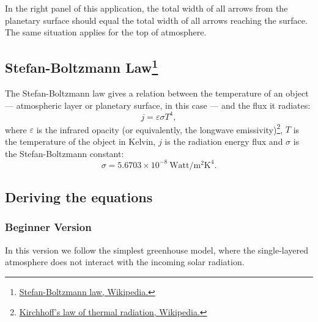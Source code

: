 \documentclass[a4paper,12pt]{article}
\begin{document}
In the right panel of this application, the total width of all arrows from the planetary surface should equal the total width of all arrows reaching the surface. The same situation applies for the top of atmosphere.

\subsection*{Stefan-Boltzmann Law\footnote{\href{https://en.wikipedia.org/wiki/Stefan–Boltzmann_law}{Stefan-Boltzmann law, Wikipedia.}}}

The Stefan-Boltzmann law gives a relation between the temperature of an object --- atmospheric layer or planetary surface, in this case --- and the flux it radiates:
\begin{equation*}
    j=\varepsilon \sigma T^4,
\end{equation*}
where $\varepsilon$ is the infrared opacity (or equivalently, the longwave emissivity)\footnote{\href{https://en.wikipedia.org/wiki/Kirchhoff\%27s_law_of_thermal_radiation}{Kirchhoff's law of thermal radiation, Wikipedia.}}, $T$ is the temperature of the object in Kelvin, $j$ is the radiation energy flux and $\sigma$ is the Stefan-Boltzmann constant:
\begin{equation*}
    \sigma=5.6703 \times 10^{-8}\  \text{Watt}/\text{m}^2 \text{K}^4.
\end{equation*}

\subsection*{Deriving the equations}

\subsubsection*{Beginner Version}
In this version we follow the simplest greenhouse model, where the single-layered atmosphere does not interact with the incoming solar radiation. 
\end{document}
